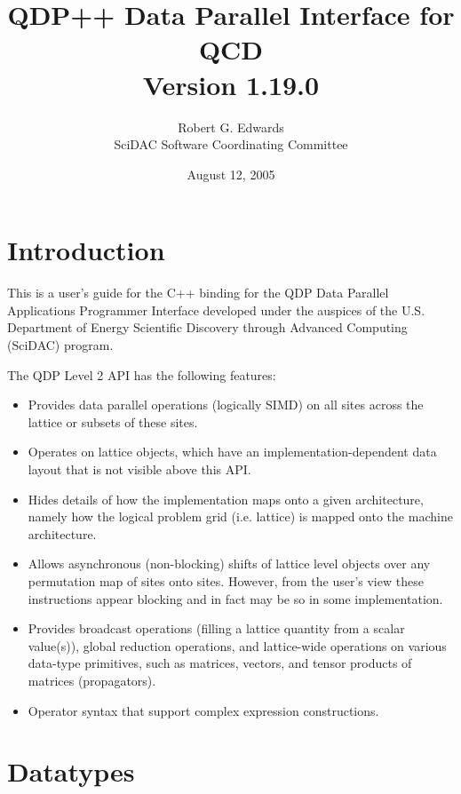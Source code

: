 \documentclass[12pt,letterpaper]{article}
\newcommand{\cpp}{C++}
\begin{document}
\title{
   QDP++ Data Parallel Interface for QCD  \\{\large Version 1.19.0}
}
\author{Robert G. Edwards\\
SciDAC Software Coordinating Committee}

\date{August 12, 2005}

\maketitle
\section{Introduction}
This is a user's guide for the \cpp{} binding for the QDP Data Parallel
Applications Programmer Interface developed under the auspices of the
U.S. Department of Energy Scientific Discovery through Advanced
Computing (SciDAC) program.

The QDP Level 2 API has the following features:
\begin{itemize}
\item Provides data parallel operations (logically SIMD) on all sites
across the lattice or subsets of these sites.
\item Operates on lattice objects, which have an
implementation-dependent data layout that is not visible above this
API.
\item Hides details of how the implementation maps onto a given
architecture, namely how the logical problem grid (i.e. lattice) is
mapped onto the machine architecture.
\item Allows asynchronous (non-blocking) shifts of lattice level
objects over any permutation map of sites onto sites. However, from
the user's view these instructions appear blocking and in fact may be
so in some implementation.
\item Provides broadcast operations (filling a lattice quantity from a
scalar value(s)), global reduction operations, and lattice-wide
operations on various data-type primitives, such as matrices, vectors,
and tensor products of matrices (propagators).
\item
Operator syntax that support complex expression constructions.
\end{itemize}

\section{Datatypes}
\label{sec.datatypes}
\end{document}
